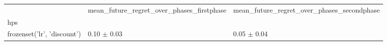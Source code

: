 \begin{tabular}{lll}
\toprule
 & mean_future_regret_over_phases_firstphase & mean_future_regret_over_phases_secondphase \\
hps &  &  \\
\midrule
frozenset({'lr', 'discount'}) & 0.10 $\pm$ 0.03 & 0.05 $\pm$ 0.04 \\
\bottomrule
\end{tabular}

